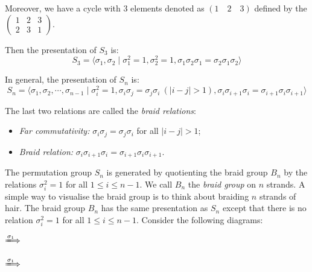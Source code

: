 \documentclass[
	11pt, %
	fleqn, %
	a4paper, %
]{LegrandOrangeBook}
\begin{document}
Moreover, we have a cycle with 3 elements denoted as $(1 \quad 2 \quad 3)$ defined by the $\begin{pmatrix}
    1 & 2 & 3 \\
    2 & 3 & 1
\end{pmatrix}$.

Then the presentation of $S_3$ is:
\[
    S_3 = \langle \sigma_1, \sigma_2 \mid \sigma_1^2 = 1, \sigma_2^2 = 1, \sigma_1 \sigma_2 \sigma_1 = \sigma_2 \sigma_1 \sigma_2 \rangle
\]

In general, the presentation of $S_n$ is:
\[
    S_n = \langle \sigma_1, \sigma_2, \cdots, \sigma_{n - 1} \mid \sigma_i^2 = 1, \sigma_i \sigma_j = \sigma_j \sigma_i\ (|i - j| > 1), \sigma_i \sigma_{i + 1} \sigma_i = \sigma_{i + 1} \sigma_i \sigma_{i + 1} \rangle
\]

The last two relations are called the \emph{braid relations}:
\begin{itemize}
    \item \emph{Far commutativity:} $\sigma_i \sigma_j = \sigma_j \sigma_i$ for all $|i - j| > 1$;
    \item \emph{Braid relation:} $\sigma_i \sigma_{i + 1} \sigma_i = \sigma_{i + 1} \sigma_i \sigma_{i + 1}$.
\end{itemize}

The permutation group $S_n$ is generated by quotienting the braid group $B_n$ by the relations $\sigma_i^2 = 1$ for all $1 \leq i \leq n - 1$. We call $B_n$ the \emph{braid group} on $n$ strands. A simple way to visualise the braid group is to think about braiding $n$ strands of hair. The braid group $B_n$ has the same presentation as $S_n$ except that there is no relation $\sigma_i^2 = 1$ for all $1 \leq i \leq n - 1$. Consider the following diagrams:
\begin{center}
    \qquad
    $\xLongrightarrow{\sigma_1}$
    \qquad
    \qquad
    $\xLongrightarrow{\sigma_1}$
    \qquad
\end{center}
\end{document}
